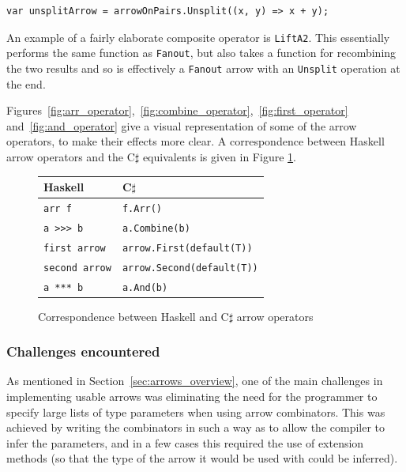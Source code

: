 \documentclass[12pt,twoside,notitlepage]{report}
\begin{document}
\begin{lstlisting}[language={[Sharp]C}]
var unsplitArrow = arrowOnPairs.Unsplit((x, y) => x + y);
\end{lstlisting}

An example of a fairly elaborate composite operator is \texttt{LiftA2}. This essentially performs the same function as \texttt{Fanout}, but also takes a function for recombining the two results and so is effectively a \texttt{Fanout} arrow with an \texttt{Unsplit} operation at the end.

Figures~\ref{fig:arr_operator},~\ref{fig:combine_operator},~\ref{fig:first_operator} and~\ref{fig:and_operator} give a visual representation of some of the arrow operators, to make their effects more clear. A correspondence between Haskell arrow operators and the C$\sharp$ equivalents is given in Figure \ref{fig:operator_correspondence}.

\begin{figure}
\centering
\begin{tabular}{| l | l |}
\hline
Haskell & C$\sharp$ \\
\hline
\texttt {arr f} & \texttt{f.Arr()} \\
\texttt{a >>> b} & \texttt{a.Combine(b)} \\
\texttt{first arrow} & \texttt{arrow.First(default(T))} \\
\texttt{second arrow} & \texttt{arrow.Second(default(T))} \\
\texttt{a *** b} & \texttt{a.And(b)} \\
\hline
\end{tabular}
\caption{Correspondence between Haskell and C$\sharp$ arrow operators}
\label{fig:operator_correspondence}
\end{figure}

\subsubsection{Challenges encountered} \label{sec:simple_arrow_challenges}

As mentioned in Section~\ref{sec:arrows_overview}, one of the main challenges in implementing usable arrows was eliminating the need for the programmer to specify large lists of type parameters when using arrow combinators. This was achieved by writing the combinators in such a way as to allow the compiler to infer the parameters, and in a few cases this required the use of extension methods (so that the type of the arrow it would be used with could be inferred).
\end{document}
